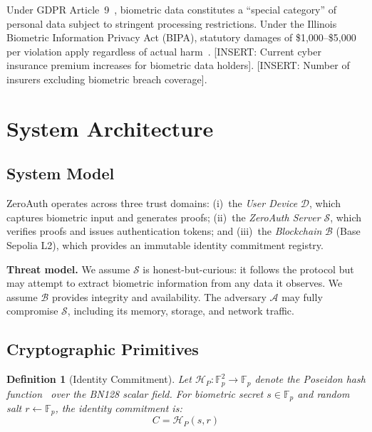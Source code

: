 \documentclass[journal, letterpaper, 10pt]{IEEEtran}
\newtheorem{definition}{Definition}
\newcommand{\placeholder}[1]{\textsf{\small\color{red!70!black}[#1]}}
\begin{document}
Under GDPR Article~9~\cite{gdpr}, biometric data constitutes a ``special category'' of personal data subject to stringent processing restrictions. Under the Illinois Biometric Information Privacy Act (BIPA), statutory damages of \$1,000--\$5,000 per violation apply regardless of actual harm~\cite{bipa}. \placeholder{INSERT: Current cyber insurance premium increases for biometric data holders}. \placeholder{INSERT: Number of insurers excluding biometric breach coverage}.

\section{System Architecture}
\label{sec:architecture}

\subsection{System Model}

ZeroAuth operates across three trust domains: (i)~the \emph{User Device} $\mathcal{D}$, which captures biometric input and generates proofs; (ii)~the \emph{ZeroAuth Server} $\mathcal{S}$, which verifies proofs and issues authentication tokens; and (iii)~the \emph{Blockchain} $\mathcal{B}$ (Base Sepolia L2), which provides an immutable identity commitment registry.

\textbf{Threat model.} We assume $\mathcal{S}$ is honest-but-curious: it follows the protocol but may attempt to extract biometric information from any data it observes. We assume $\mathcal{B}$ provides integrity and availability. The adversary $\mathcal{A}$ may fully compromise $\mathcal{S}$, including its memory, storage, and network traffic.

\subsection{Cryptographic Primitives}

\begin{definition}[Identity Commitment]
\label{def:commitment}
Let $\mathcal{H}_P: \mathbb{F}_p^2 \to \mathbb{F}_p$ denote the Poseidon hash function~\cite{poseidon} over the BN128 scalar field. For biometric secret $s \in \mathbb{F}_p$ and random salt $r \leftarrow \mathbb{F}_p$, the identity commitment is:
\begin{equation}
  C = \mathcal{H}_P(s, r)
  \label{eq:commitment}
\end{equation}
\end{definition}
\end{document}
